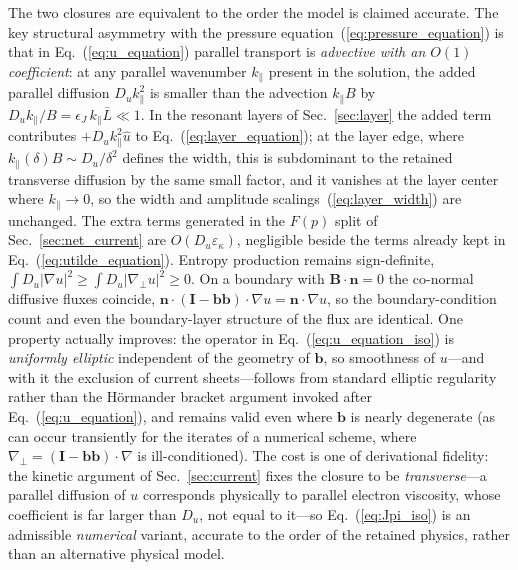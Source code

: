 \documentclass[english]{article}
\newcommand{\bB}{\mathbf{B}}
\newcommand{\bb}{\mathbf{b}}
\newcommand{\bn}{\mathbf{n}}
\newcommand{\bI}{\mathbf{I}}
\newcommand{\gradperp}{\nabla_{\!\perp}}
\begin{document}
The two closures are equivalent to the order the model is claimed accurate. The key
structural asymmetry with the pressure equation~(\ref{eq:pressure_equation}) is that in
Eq.~(\ref{eq:u_equation}) parallel transport is \emph{advective with an $O(1)$
coefficient}: at any parallel wavenumber $k_\parallel$ present in the solution, the added
parallel diffusion $D_u k_\parallel^{2}$ is smaller than the advection $k_\parallel B$ by
$D_u k_\parallel/B=\epsilon_J\,k_\parallel\bar L\ll1$. In the resonant layers of
Sec.~\ref{sec:layer} the added term contributes $+D_u k_\parallel^{2}\hat u$ to
Eq.~(\ref{eq:layer_equation}); at the layer edge, where
$k_\parallel(\delta)B\sim D_u/\delta^{2}$ defines the width, this is subdominant to the
retained transverse diffusion by the same small factor, and it vanishes at the layer
center where $k_\parallel\rightarrow0$, so the width and amplitude
scalings~(\ref{eq:layer_width}) are unchanged. The extra terms generated in the $F(p)$
split of Sec.~\ref{sec:net_current} are $O(D_u\varepsilon_\kappa)$, negligible beside the
terms already kept in Eq.~(\ref{eq:utilde_equation}). Entropy production remains
sign-definite, $\int D_u|\nabla u|^{2}\ge\int D_u|\gradperp u|^{2}\ge0$. On a boundary
with $\bB\cdot\bn=0$ the co-normal diffusive fluxes coincide,
$\bn\cdot(\bI-\bb\bb)\cdot\nabla u=\bn\cdot\nabla u$, so the boundary-condition count and
even the boundary-layer structure of the flux are identical. One property actually
improves: the operator in Eq.~(\ref{eq:u_equation_iso}) is \emph{uniformly elliptic}
independent of the geometry of $\bb$, so smoothness of $u$---and with it the exclusion of
current sheets---follows from standard elliptic regularity rather than the H\"ormander
bracket argument invoked after Eq.~(\ref{eq:u_equation}), and remains valid even where
$\bb$ is nearly degenerate (as can occur transiently for the iterates of a numerical
scheme, where $\gradperp=(\bI-\bb\bb)\cdot\nabla$ is ill-conditioned). The cost is one of
derivational fidelity: the kinetic argument of Sec.~\ref{sec:current} fixes the closure
to be \emph{transverse}---a parallel diffusion of $u$ corresponds physically to parallel
electron viscosity, whose coefficient is far larger than $D_u$, not equal to it---so
Eq.~(\ref{eq:Jpi_iso}) is an admissible \emph{numerical} variant, accurate to the order
of the retained physics, rather than an alternative physical model.
\end{document}
